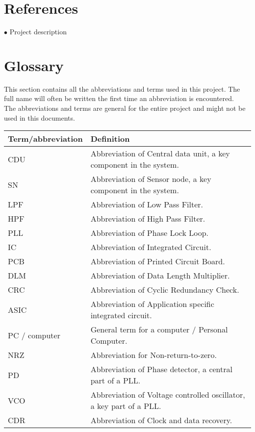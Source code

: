 \section{References}
$\bullet$ Project description

\section{Glossary}
This section contains all the abbreviations and terms used in this project. The full name will often be written the first time an abbreviation is encountered.\\
The abbreviations and terms are general for the entire project and might not be used in this documents.
\begin{table}[H]
\centering
\begin{tabular}{|p{4cm}|p{7cm}|}
\hline
Term/abbreviation & Definition\\ \hline
CDU & Abbreviation of Central data unit, a key component in the system.\\ \hline
SN & Abbreviation of Sensor node, a key component in the system.\\ \hline
LPF & Abbreviation of Low Pass Filter. \\ \hline
HPF & Abbreviation of High Pass Filter. \\ \hline
PLL & Abbreviation of Phase Lock Loop. \\ \hline
IC & Abbreviation of Integrated Circuit. \\ \hline
PCB & Abbreviation of Printed Circuit Board. \\ \hline
DLM & Abbreviation of Data Length Multiplier. \\ \hline
CRC & Abbreviation of Cyclic Redundancy Check. \\ \hline
ASIC & Abbreviation of Application specific integrated circuit.\\ \hline
PC / computer & General term for a computer / Personal Computer.\\ \hline
NRZ & Abbreviation for Non-return-to-zero.\\ \hline
PD & Abbreviation of Phase detector, a central part of a PLL.\\ \hline
VCO & Abbreviation of Voltage controlled oscillator, a key part of a PLL.\\ \hline
CDR & Abbreviation of Clock and data recovery. \\ \hline
\end{tabular}
\end{table}
